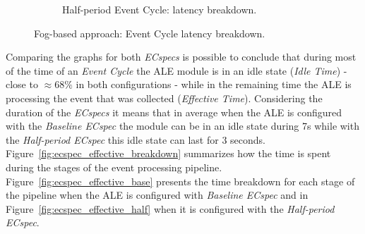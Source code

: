 \begin{figure}[ht!]
\begin{subfigure}{.5\textwidth}
   \caption{Half-period Event Cycle: latency breakdown.}
   \label{fig:ecspec_half}
 \end{subfigure}
 \caption[Fog-based approach: event latency breakdown.]{Fog-based approach: Event Cycle latency breakdown.}
 \label{fig:ecspec_breakdown}
\end{figure}

Comparing the graphs for both \textit{ECspecs} is possible to conclude that during most of the time of
an \textit{Event Cycle} the \gls{ALE} module is in an idle state (\textit{Idle Time}) - close to $\approx68\%$
in both configurations - while in the remaining time the \gls{ALE} is processing the event that was
collected (\textit{Effective Time}). Considering the duration of the \textit{ECspecs} it means that in
average when the \gls{ALE} is configured with the \textit{Baseline ECspec} the module can be in an idle
state during 7s while with the \textit{Half-period ECspec} this idle state can last for 3 seconds.\\

Figure~\ref{fig:ecspec_effective_breakdown} summarizes how the time is spent during the stages of the
event processing pipeline. Figure~\ref{fig:ecspec_effective_base} presents the time breakdown for
each stage of the pipeline when the \gls{ALE} is configured with \textit{Baseline ECspec} and in
Figure~\ref{fig:ecspec_effective_half} when it is configured with the \textit{Half-period ECspec}.\\

